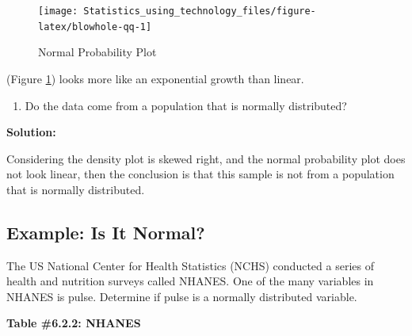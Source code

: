 \documentclass[
]{book}
\providecommand{\tightlist}{%
  \setlength{\itemsep}{0pt}\setlength{\parskip}{0pt}}
\begin{document}
\begin{figure}
\texttt{[image: Statistics\_using\_technology\_files/figure-latex/blowhole-qq-1]} \caption{Normal Probability Plot}\label{fig:blowhole-qq}
\end{figure}

(Figure \ref{fig:blowhole-qq}) looks more like an exponential growth than linear.

\begin{enumerate}
\def\labelenumi{\alph{enumi}.}
\setcounter{enumi}{4}
\tightlist
\item
  Do the data come from a population that is normally distributed?
\end{enumerate}

\textbf{Solution:}

Considering the density plot is skewed right, and the normal probability plot does not look linear, then the conclusion is that this sample is not from a population that is normally distributed.

\hypertarget{example-is-it-normal-1}{%
\subsection{Example: Is It Normal?}\label{example-is-it-normal-1}}

The US National Center for Health Statistics (NCHS) conducted a series of health and nutrition surveys called NHANES. One of the many variables in NHANES is pulse. Determine if pulse is a normally distributed variable.

\textbf{Table \#6.2.2: NHANES}
\end{document}
